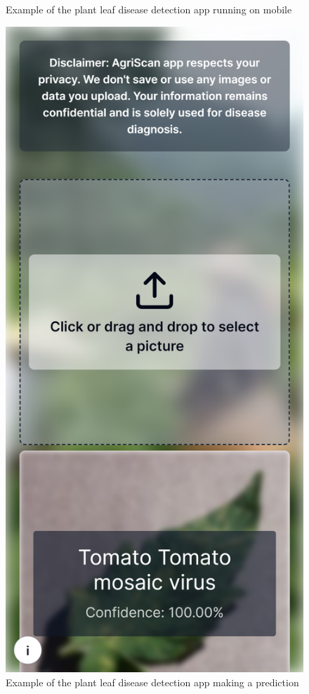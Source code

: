 \documentclass{article}
\begin{document}
\begin{figure}[h]
\begin{minipage}[b]{0.45\linewidth}
  \caption{Example of the plant leaf disease detection app running on mobile}
  \label{fig:mobile_version}
\end{minipage}
\hspace{0.5cm}
\begin{minipage}[b]{0.45\linewidth}
  \centering
  \includegraphics[height=0.4\textheight]{phone-predict.png}
  \caption{Example of the plant leaf disease detection app making a prediction}
  \label{fig:prediction_mobile}
\end{minipage}
\end{figure}
\end{document}
